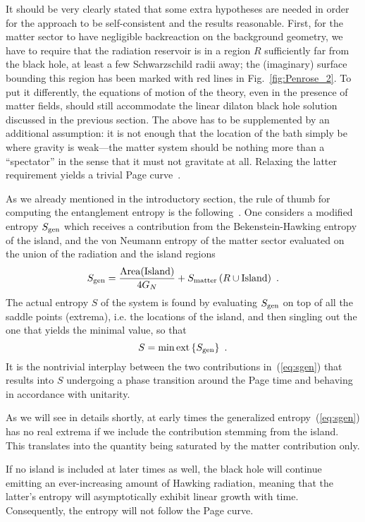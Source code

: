 \documentclass[a4paper, 12pt]{article}
\def\be{\begin{equation}}
\def\ee{\end{equation}}
\begin{document}
It should be very clearly stated that some extra hypotheses are needed in order for the approach to be self-consistent and the results reasonable. 
First, for the matter sector to have negligible backreaction on the background geometry, we have to require that the radiation reservoir is in a region $R$  sufficiently far from the black hole, at least a few Schwarzschild radii away; the (imaginary) surface bounding this region has been marked with red lines in Fig.~\ref{fig:Penrose_2}. To put it differently, the equations of motion of the theory, even in the presence of matter fields, should still accommodate the linear dilaton black hole solution discussed in the previous section. The above has to be supplemented by an  additional assumption: it is not enough that the location of the bath simply be where gravity is weak---the matter system should be nothing more than a ``spectator'' in the sense that it must not gravitate at all. Relaxing the latter requirement yields a trivial Page curve~\cite{Laddha:2020kvp}. 

As we already mentioned in the introductory section, the rule of thumb for computing the entanglement entropy is the following~\cite{Almheiri:2019hni,Almheiri:2020cfm}. One considers a modified entropy $S_{\rm gen}$ which receives a contribution from the Bekenstein-Hawking  entropy of the island, and the von Neumann entropy of the matter sector evaluated on the union of the radiation and the island regions
\be
\label{eq:sgen}
S_{\rm gen}=\frac{\text{Area(Island)}}{4G_N} +S_{\rm matter}\left(R\cup\text{Island}\right) \ . 
\ee
The actual entropy $S$ of the system is found by evaluating $S_{\rm gen}$ on top of all the saddle points (extrema), i.e. the locations of the island, and then singling out the one that yields the minimal value, so that
\be
S= \min\text{ext}\left\{S_{\rm gen}\right\} \ .
\ee
It is the nontrivial interplay between the two contributions in~(\ref{eq:sgen}) that results into $S$ undergoing a phase transition around the Page time and behaving in accordance with unitarity. 

As we will see in details shortly, at early times the generalized entropy~(\ref{eq:sgen}) has no real extrema if we include the contribution stemming from the island. This translates into the quantity being saturated by the matter contribution only. 

If no island is included at later times as well, the black hole will continue emitting an ever-increasing amount of Hawking radiation, meaning that the latter's entropy will asymptotically exhibit linear growth with time. Consequently, the entropy will not follow the Page curve. 
\end{document}
